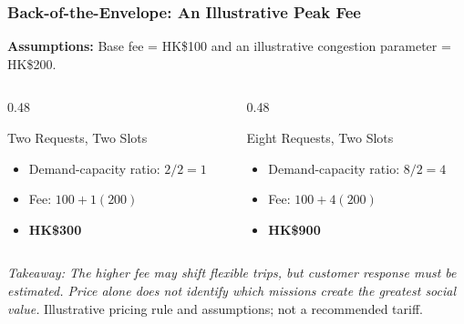 \documentclass{beamer}
\begin{document}
\begin{frame}[t,shrink=10]
\frametitle{Back-of-the-Envelope: An Illustrative Peak Fee}
\textbf{Assumptions:} Base fee = HK\$100 and an illustrative congestion parameter = HK\$200.
\begin{columns}[T]
\begin{column}{0.48\textwidth}\begin{block}{Two Requests, Two Slots}
\begin{itemize}
\item Demand-capacity ratio: $2/2=1$
\item Fee: $100+1(200)$
\item \textbf{HK\$300}
\end{itemize}\end{block}\end{column}
\begin{column}{0.48\textwidth}\begin{block}{Eight Requests, Two Slots}
\begin{itemize}
\item Demand-capacity ratio: $8/2=4$
\item Fee: $100+4(200)$
\item \textbf{HK\$900}
\end{itemize}\end{block}\end{column}
\end{columns}
\textit{Takeaway: The higher fee may shift flexible trips, but customer response must be estimated. Price alone does not identify which missions create the greatest social value.}
\vfill{\tiny Illustrative pricing rule and assumptions; not a recommended tariff.}
\end{frame}
\end{document}

